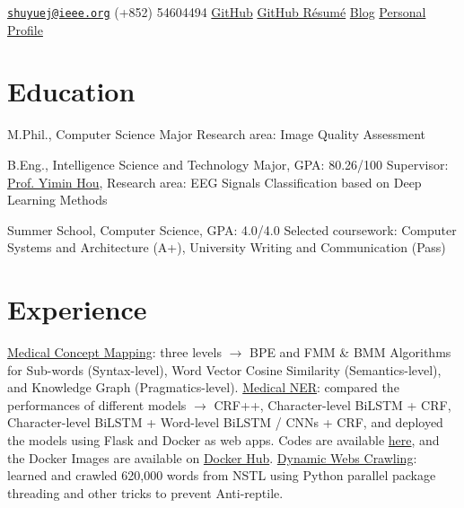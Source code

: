 \documentclass{my_cv}
\begin{document}
\hspace*{\fill}


\hspace*{\fill}

\longcontact
{\href{mailto:shuyuej@ieee.org}{\nolinkurl{shuyuej@ieee.org}}}
{(+852) 54604494}
{\href{https://github.com/SuperBruceJia}{GitHub}}
{\href{https://resume.github.io/?SuperBruceJia}{GitHub Résumé}}
{\href{http://shuyuej.com/blog}{Blog}}
{\href{https://shuyuej.com/}{Personal Profile}}

\hspace*{\fill} 

\section{Education}
\workitemstwo
{M.Phil., Computer Science Major}
{Research area: Image Quality Assessment}

\workitemstwo
{B.Eng., Intelligence Science and Technology Major, GPA: 80.26/100}
{Supervisor: \href{mailto:ymh7821@163.com}{Prof. Yimin Hou}, Research area: EEG Signals Classification based on Deep Learning Methods}

\workitemstwo
{Summer School, Computer Science, GPA: 4.0/4.0}
{Selected coursework: Computer Systems and Architecture (A+), University Writing and Communication (Pass)}

\hspace*{\fill} 

\section{Experience}
\workitemsthree
{\href{https://github.com/SuperBruceJia/Medical-Concept-Mapping}{Medical Concept Mapping}: three levels $\rightarrow$ BPE and FMM \& BMM Algorithms for Sub-words (Syntax-level), Word Vector Cosine Similarity (Semantics-level), and Knowledge Graph (Pragmatics-level).}
{\href{https://github.com/SuperBruceJia/MedicalNER}{Medical NER}: compared the performances of different models $\rightarrow$ CRF++, Character-level BiLSTM + CRF, Character-level BiLSTM + Word-level BiLSTM / CNNs + CRF, and deployed the models using Flask and Docker as web apps. Codes are available \href{https://github.com/SuperBruceJia/pytorch-flask-deploy-webapp}{here}, and the Docker Images are available on \href{https://hub.docker.com/u/shuyuej}{Docker Hub}.}
{\href{https://github.com/SuperBruceJia/dynamic-web-crawlering-python}{Dynamic Webs Crawling}: learned and crawled 620,000 words from NSTL using Python parallel package threading and other tricks to prevent Anti-reptile.}
\end{document}

